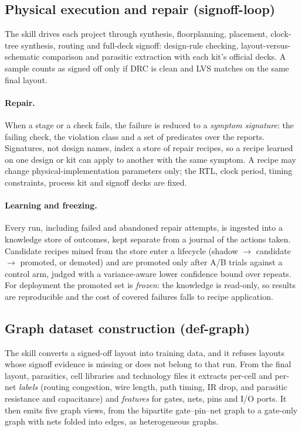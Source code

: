 \subsection{Physical execution and repair (signoff-loop)}
\label{sec:skill-signoff}
The skill drives each project through synthesis, floorplanning, placement, clock-tree synthesis,
routing and full-deck signoff: design-rule checking, layout-versus-schematic comparison and parasitic
extraction with each kit's official decks. A sample counts as signed off only if DRC is clean and LVS
matches on the same final layout.

\paragraph{Repair.}
When a stage or a check fails, the failure is reduced to a \emph{symptom signature}: the failing
check, the violation class and a set of predicates over the reports. Signatures, not design names,
index a store of repair recipes, so a recipe learned on one design or kit can apply to another with
the same symptom. A recipe may change physical-implementation parameters only; the RTL, clock period,
timing constraints, process kit and signoff decks are fixed.

\paragraph{Learning and freezing.}
Every run, including failed and abandoned repair attempts, is ingested into a knowledge store of
outcomes, kept separate from a journal of the actions taken. Candidate recipes mined from the store
enter a lifecycle (shadow $\rightarrow$ candidate $\rightarrow$ promoted, or demoted) and are
promoted only after A/B trials against a control arm, judged with a variance-aware lower confidence
bound over repeats. For deployment the promoted set is \emph{frozen}: the knowledge is read-only, so
results are reproducible and the cost of covered failures falls to recipe application.

\subsection{Graph dataset construction (def-graph)}
\label{sec:skill-graph}
The skill converts a signed-off layout into training data, and it refuses layouts whose signoff
evidence is missing or does not belong to that run. From the final layout, parasitics, cell libraries
and technology files it extracts per-cell and per-net \emph{labels} (routing congestion, wire length,
path timing, IR drop, and parasitic resistance and capacitance) and \emph{features} for gates, nets,
pins and I/O ports. It then emits five graph views, from the bipartite gate--pin--net graph to a
gate-only graph with nets folded into edges, as heterogeneous graphs.

